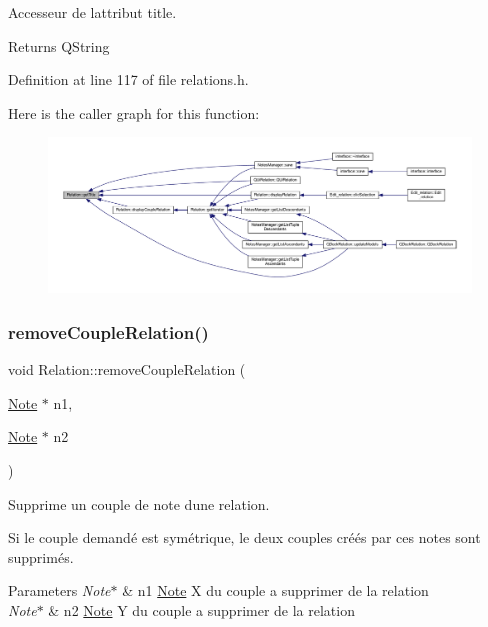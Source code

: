 Accesseur de l\textquotesingle{}attribut title. 

\begin{DoxyReturn}{Returns}
Q\+String 
\end{DoxyReturn}


Definition at line 117 of file relations.\+h.

Here is the caller graph for this function\+:
\nopagebreak
\begin{figure}[H]
\begin{center}
\leavevmode
\includegraphics[width=350pt]{class_relation_aef1db31b9f1a2dc79a1688d4e466e2b1_icgraph}
\end{center}
\end{figure}
\mbox{\label{class_relation_ab81e16d688dcb4703e8ab299fef80c10}} 
\subsubsection{\texorpdfstring{remove\+Couple\+Relation()}{removeCoupleRelation()}}
{\footnotesize\ttfamily void Relation\+::remove\+Couple\+Relation (\begin{DoxyParamCaption}\item[{\hyperlink{class_note}{Note} $\ast$}]{n1,  }\item[{\hyperlink{class_note}{Note} $\ast$}]{n2 }\end{DoxyParamCaption})}



Supprime un couple de note d\textquotesingle{}une relation. 

Si le couple demandé est symétrique, le deux couples créés par ces notes sont supprimés. 
\begin{DoxyParams}{Parameters}
{\em Note$\ast$} & n1 \hyperlink{class_note}{Note} X du couple a supprimer de la relation \\
\hline
{\em Note$\ast$} & n2 \hyperlink{class_note}{Note} Y du couple a supprimer de la relation \\
\hline
\end{DoxyParams}


